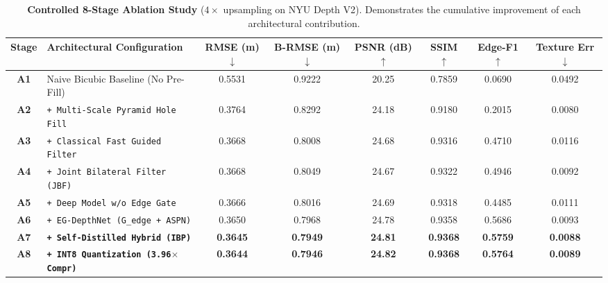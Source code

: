 \documentclass[10pt,a4paper]{article}
\begin{document}
\begin{table}[h!]
\centering
\caption{\textbf{Controlled 8-Stage Ablation Study} ($4\times$ upsampling on NYU Depth V2). Demonstrates the cumulative improvement of each architectural contribution.}
\label{tab:ablation}
\small
\begin{tabularx}{\textwidth}{clcccccc}
\toprule
\textbf{Stage} & \textbf{Architectural Configuration} & \textbf{RMSE (m)} $\downarrow$ & \textbf{B-RMSE (m)} $\downarrow$ & \textbf{PSNR (dB)} $\uparrow$ & \textbf{SSIM} $\uparrow$ & \textbf{Edge-F1} $\uparrow$ & \textbf{Texture Err} $\downarrow$ \\
\midrule
\textbf{A1} & Naive Bicubic Baseline (No Pre-Fill) & 0.5531 & 0.9222 & 20.25 & 0.7859 & 0.0690 & 0.0492 \\
\textbf{A2} & \texttt{+ Multi-Scale Pyramid Hole Fill} & 0.3764 & 0.8292 & 24.18 & 0.9180 & 0.2015 & 0.0080 \\
\textbf{A3} & \texttt{+ Classical Fast Guided Filter} & 0.3668 & 0.8008 & 24.68 & 0.9316 & 0.4710 & 0.0116 \\
\textbf{A4} & \texttt{+ Joint Bilateral Filter (JBF)} & 0.3668 & 0.8049 & 24.67 & 0.9322 & 0.4946 & 0.0092 \\
\textbf{A5} & \texttt{+ Deep Model w/o Edge Gate} & 0.3666 & 0.8016 & 24.69 & 0.9318 & 0.4485 & 0.0111 \\
\textbf{A6} & \texttt{+ EG-DepthNet (G\_edge + ASPN)} & 0.3650 & 0.7968 & 24.78 & 0.9358 & 0.5686 & 0.0093 \\
\textbf{A7} & \textbf{\texttt{+ Self-Distilled Hybrid (IBP)}} & \textbf{0.3645} & \textbf{0.7949} & \textbf{24.81} & \textbf{0.9368} & \textbf{0.5759} & \textbf{0.0088} \\
\textbf{A8} & \textbf{\texttt{+ INT8 Quantization (3.96$\times$ Compr)}} & \textbf{0.3644} & \textbf{0.7946} & \textbf{24.82} & \textbf{0.9368} & \textbf{0.5764} & \textbf{0.0089} \\
\bottomrule
\end{tabularx}
\end{table}
\end{document}
